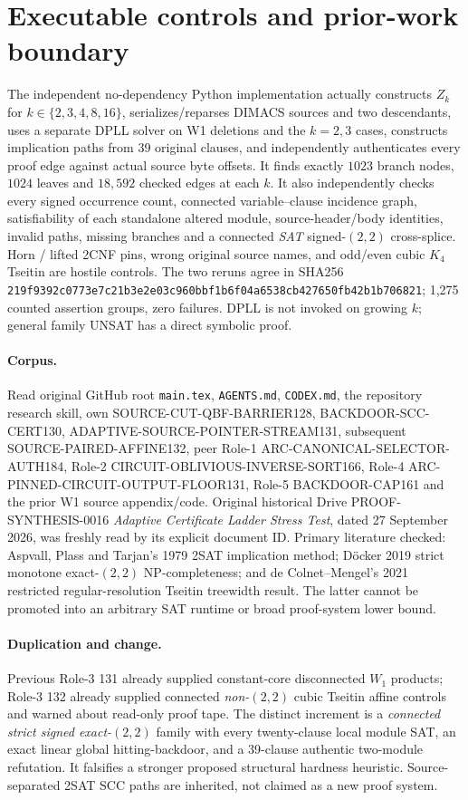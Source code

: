 \documentclass[11pt]{article}
\begin{document}
\section{Executable controls and prior-work boundary}
The independent no-dependency Python implementation actually constructs $Z_k$ for $k\in\{2,3,4,8,16\}$, serializes/reparses DIMACS sources and two descendants, uses a separate DPLL solver on W1 deletions and the $k=2,3$ cases, constructs implication paths from 39 original clauses, and independently authenticates every proof edge against actual source byte offsets. It finds exactly $1023$ branch nodes, $1024$ leaves and $18,592$ checked edges at each $k$. It also independently checks every signed occurrence count, connected variable--clause incidence graph, satisfiability of each standalone altered module, source-header/body identities, invalid paths, missing branches and a connected \emph{SAT} signed-$(2,2)$ cross-splice. Horn / lifted 2CNF pins, wrong original source names, and odd/even cubic $K_4$ Tseitin are hostile controls. The two reruns agree in SHA256 \texttt{219f9392c0773e7c21b3e2e03c960bbf1b6f04a6538cb427650fb42b1b706821}; 1,275 counted assertion groups, zero failures. DPLL is not invoked on growing $k$; general family UNSAT has a direct symbolic proof.

\paragraph{Corpus.} Read original GitHub root \texttt{main.tex}, \texttt{AGENTS.md}, \texttt{CODEX.md}, the repository research skill, own SOURCE-CUT-QBF-BARRIER128, BACKDOOR-SCC-CERT130, ADAPTIVE-SOURCE-POINTER-STREAM131, subsequent SOURCE-PAIRED-AFFINE132, peer Role-1 ARC-CANONICAL-SELECTOR-AUTH184, Role-2 CIRCUIT-OBLIVIOUS-INVERSE-SORT166, Role-4 ARC-PINNED-CIRCUIT-OUTPUT-FLOOR131, Role-5 BACKDOOR-CAP161 and the prior W1 source appendix/code. Original historical Drive PROOF-SYNTHESIS-0016 \emph{Adaptive Certificate Ladder Stress Test}, dated 27 September 2026, was freshly read by its explicit document ID. Primary literature checked: Aspvall, Plass and Tarjan's 1979 2SAT implication method; D\"ocker 2019 strict monotone exact-$(2,2)$ NP-completeness; and de Colnet--Mengel's 2021 restricted regular-resolution Tseitin treewidth result. The latter cannot be promoted into an arbitrary SAT runtime or broad proof-system lower bound.

\paragraph{Duplication and change.} Previous Role-3 131 already supplied constant-core disconnected $W_1$ products; Role-3 132 already supplied connected \emph{non-$(2,2)$} cubic Tseitin affine controls and warned about read-only proof tape. The distinct increment is a \emph{connected strict signed exact-$(2,2)$} family with every twenty-clause local module SAT, an exact linear global hitting-backdoor, and a 39-clause authentic two-module refutation. It falsifies a stronger proposed structural hardness heuristic. Source-separated 2SAT SCC paths are inherited, not claimed as a new proof system.
\end{document}
